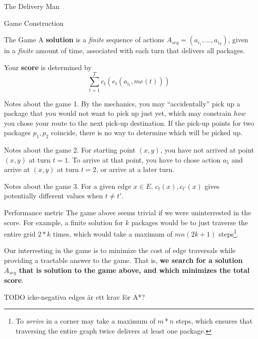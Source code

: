 \begin{section}{The Delivery Man}
\begin{subsection}{Game Construction}
\begin{subsubsection}{The Game}
      A \textbf{solution} is a \textit{finite} sequence of actions $A_{seq} = (a_{i_1}, ..., a_{i_T})$, given in a \textit{finite} amount of time, associated with each turn that delivers all packages.

      Your \textbf{score} is determined by
      \begin{equation*}
        \sum_{t = 1}^T c_t(e_t(a_{i_t}, me(t)))
      \end{equation*}      

      \begin{paragraph}{Notes about the game 1.}
        By the mechanics, you may ``accidentally'' pick up a package that you would not want to pick up just yet, which may constrain \textit{how} you chose your route to the next pick-up destination. If the pick-up points for two packages $p_1, p_2$ coincide, there is no way to determine which will be picked up.
      \end{paragraph}

      \begin{paragraph}{Notes about the game 2.}
        For starting point $(x, y)$, you have not arrived at point $(x,y)$ at turn $t=1$. To arrive at that point, you have to chose action $a_5$ and arrive at $(x, y)$ at turn $t=2$, or arrive at a later turn.
      \end{paragraph}

      \begin{paragraph}{Notes about the game 3.}
        For a given edge $x\in E$, $c_t(x), c_{t'}(x)$ gives potentially different values when $t \neq t'$.
      \end{paragraph}

    \end{subsubsection}
    
    \begin{subsubsection}{Performance metric}
      The game above seems trivial if we were uninterrested in the score. For example, a finite solution for $k$ packages would be to just traverse the entire grid $2*k$ times, which would take a maximum of $mn(2k+1)$ steps\footnote{To \textit{arrive} in a corner may take a maximum of $m*n$ steps, which ensures that traversing the entire graph twice delivers at least one package.}.

      Our interresting in the game is to minimize the cost of edge traversals while providing a tractable answer to the game. That is, \textbf{we search for a solution $A_{seq}$ that is solution to the game above, and which minimizes the total score}. 
    \end{subsubsection}

    TODO icke-negativa edges är ett krav för A*?
  \end{subsection}

  

\end{section}
